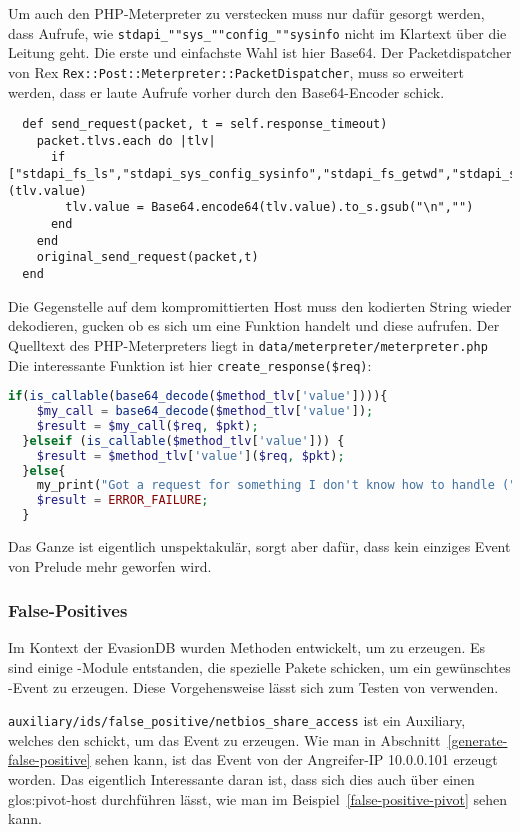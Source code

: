 Um auch den PHP-Meterpreter zu verstecken muss nur dafür gesorgt
werden, dass Aufrufe, wie \texttt{stdapi\_""sys\_""config\_""sysinfo} nicht im
Klartext über die Leitung geht. Die erste und einfachste Wahl ist hier
Base64. Der Packetdispatcher von Rex
\texttt{Rex::Post::Meterpreter::PacketDispatcher}, muss so erweitert werden,
dass er laute Aufrufe vorher durch den Base64-Encoder schick.

\begin{lstlisting}
  def send_request(packet, t = self.response_timeout)
    packet.tlvs.each do |tlv|
      if ["stdapi_fs_ls","stdapi_sys_config_sysinfo","stdapi_fs_getwd","stdapi_sys_config_getuid"].member?(tlv.value)
        tlv.value = Base64.encode64(tlv.value).to_s.gsub("\n","")
      end
    end
    original_send_request(packet,t)
  end
\end{lstlisting}

Die Gegenstelle auf dem kompromittierten Host muss den kodierten
String wieder dekodieren, gucken ob es sich um eine Funktion handelt
und diese aufrufen. Der Quelltext des PHP-Meterpreters liegt in
\texttt{data/meterpreter/meterpreter.php} Die interessante Funktion ist hier
\texttt{create\_response(\$req)}:

\begin{lstlisting}[language=PHP]
  if(is_callable(base64_decode($method_tlv['value']))){
    $my_call = base64_decode($method_tlv['value']);
    $result = $my_call($req, $pkt);
  }elseif (is_callable($method_tlv['value'])) {
    $result = $method_tlv['value']($req, $pkt);
  }else{
    my_print("Got a request for something I don't know how to handle (". $method_tlv['value'] ."), returning failure");
    $result = ERROR_FAILURE;
  }
\end{lstlisting}

Das Ganze ist eigentlich unspektakulär, sorgt aber dafür, dass kein
einziges Event von Prelude mehr geworfen wird.

\subsubsection{False-Positives}
\label{false-positives}

Im Kontext der EvasionDB wurden Methoden entwickelt, um
 zu erzeugen.
Es sind einige -Module entstanden, die
spezielle Pakete schicken, um ein gewünschtes -Event zu erzeugen.
Diese Vorgehensweise lässt sich zum Testen von  verwenden.

\texttt{auxiliary/ids/false\_positive/netbios\_share\_access} ist ein
Auxiliary, welches den  schickt, um das Event zu erzeugen. Wie
man in Abschnitt~\ref{generate-false-positive} sehen kann, ist das Event von der
Angreifer-IP 10.0.0.101 erzeugt worden. Das eigentlich Interessante daran ist,
dass sich dies auch über einen \gls{glos:pivot-host}
durchführen lässt, wie man im Beispiel~\ref{false-positive-pivot} sehen kann.

